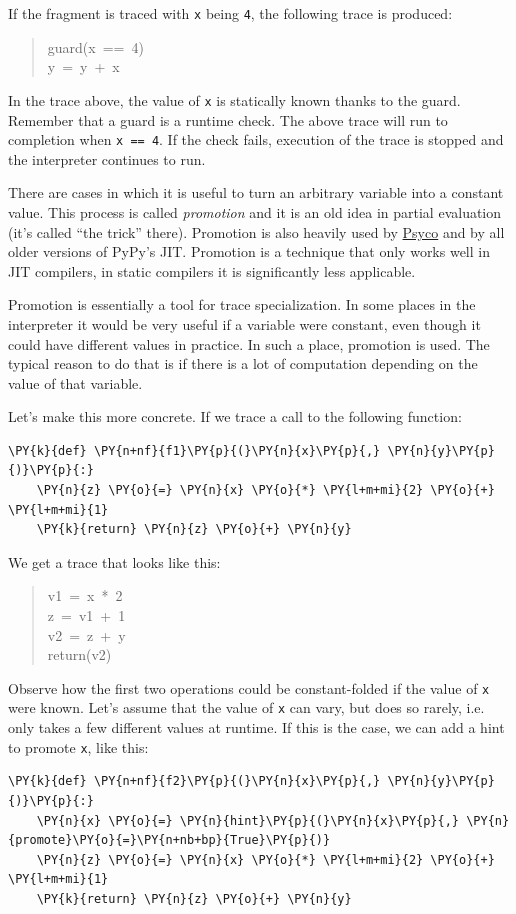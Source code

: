 \documentclass{sig-alternate}
\begin{document}
If the fragment is traced with \texttt{x} being \texttt{4}, the following trace is
produced:
%
\begin{quote}{\ttfamily \raggedright \noindent
guard(x~==~4)\\
y~=~y~+~x
}
\end{quote}

In the trace above, the value of \texttt{x} is statically known thanks to the
guard. Remember that a guard is a runtime check. The above trace will run to
completion when \texttt{x == 4}. If the check fails, execution of the trace is
stopped and the interpreter continues to run.

There are cases in which it is useful to turn an arbitrary variable
into a constant value. This process is called \emph{promotion} and it is an old idea
in partial evaluation (it's called ``the trick'' there). Promotion is also heavily
used by \href{http://psyco.sourceforge.net/}{Psyco} and by all older versions of PyPy's JIT. Promotion is a technique
that only works well in JIT compilers, in
static compilers it is significantly less applicable.

Promotion is essentially a tool for trace specialization. In some places in the
interpreter it would be very useful if a variable were constant, even though it
could have different values in practice. In such a place, promotion is used. The
typical reason to do that is if there is
a lot of computation depending on the value of that variable.

Let's make this more concrete. If we trace a call to the following function:
\begin{Verbatim}[commandchars=\\\{\}]
\PY{k}{def} \PY{n+nf}{f1}\PY{p}{(}\PY{n}{x}\PY{p}{,} \PY{n}{y}\PY{p}{)}\PY{p}{:}
    \PY{n}{z} \PY{o}{=} \PY{n}{x} \PY{o}{*} \PY{l+m+mi}{2} \PY{o}{+} \PY{l+m+mi}{1}
    \PY{k}{return} \PY{n}{z} \PY{o}{+} \PY{n}{y}
\end{Verbatim}

We get a trace that looks like this:
%
\begin{quote}{\ttfamily \raggedright \noindent
v1~=~x~*~2\\
z~=~v1~+~1\\
v2~=~z~+~y\\
return(v2)
}
\end{quote}

Observe how the first two operations could be constant-folded if the value of
\texttt{x} were known. Let's assume that the value of \texttt{x} can vary, but does so
rarely, i.e. only takes a few different values at runtime. If this is the
case, we can add a hint to promote \texttt{x}, like this:
\begin{Verbatim}[commandchars=\\\{\}]
\PY{k}{def} \PY{n+nf}{f2}\PY{p}{(}\PY{n}{x}\PY{p}{,} \PY{n}{y}\PY{p}{)}\PY{p}{:}
    \PY{n}{x} \PY{o}{=} \PY{n}{hint}\PY{p}{(}\PY{n}{x}\PY{p}{,} \PY{n}{promote}\PY{o}{=}\PY{n+nb+bp}{True}\PY{p}{)}
    \PY{n}{z} \PY{o}{=} \PY{n}{x} \PY{o}{*} \PY{l+m+mi}{2} \PY{o}{+} \PY{l+m+mi}{1}
    \PY{k}{return} \PY{n}{z} \PY{o}{+} \PY{n}{y}
\end{Verbatim}
\end{document}
